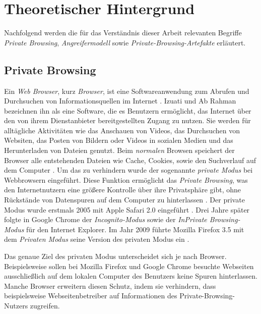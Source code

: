 \chapter{Theoretischer Hintergrund}\label{chap:theorie}

Nachfolgend werden die für das Verständnis dieser Arbeit relevanten Begriffe \textit{Private Browsing}, \textit{Angreifermodell} sowie \textit{Private-Browsing-Artefakte} erläutert.

\section{Private Browsing}\label{chap:theorie-private-browsing}

Ein \textit{Web Browser}, kurz \textit{Browser}, ist eine Softwareanwendung zum Abrufen und Durchsuchen von Informationsquellen im Internet \cite{Rochmadi.2017}. Izuati und Ab Rahman \cite{Izzati.2022} bezeichnen ihn als eine Software, die es Benutzern ermöglicht, das Internet über den von ihrem Dienstanbieter bereitgestellten Zugang zu nutzen. Sie werden für alltägliche Aktivitäten wie das Anschauen von Videos, das Durchsuchen von Websiten, das Posten von Bildern oder Videos in sozialen Medien und das Herunterladen von Dateien genutzt. \cite{Izzati.2022}
Beim \textit{normalen} Browsen speichert der Browser alle entstehenden Dateien wie Cache, Cookies, sowie den Suchverlauf auf dem Computer \cite{Izzati.2022}. Um das zu verhindern wurde der sogenannte \textit{private Modus} bei Webbrowsern eingeführt. Diese Funktion ermöglicht das \textit{Private Browsing}, was den Internetnutzern eine größere Kontrolle über ihre Privatsphäre gibt, ohne Rückstände von Datenspuren auf dem Computer zu hinterlassen \cite{Said.2011}. Der private Modus wurde erstmals 2005 mit Apple Safari 2.0 eingeführt \cite{Said.2011}. Drei Jahre später folgte in Google Chrome der \textit{Incognito-Modus} sowie der \textit{InPrivate Browsing-Modus} für den Internet Explorer. Im Jahr 2009 führte Mozilla Firefox 3.5 mit dem \textit{Privaten Modus} seine Version des privaten Modus ein \cite{Montasari.2015}.

Das genaue Ziel des privaten Modus unterscheidet sich je nach Browser. Beispielsweise sollen bei Mozilla Firefox und Google Chrome besuchte Webseiten ausschließlich auf dem lokalen Computer des Benutzers keine Spuren hinterlassen. \cite{MozillaWiki.05.06.2023,GoogleChrome.} Manche Browser erweitern diesen Schutz, indem sie verhindern, dass beispielsweise Webseitenbetreiber auf Informationen des Private-Browsing-Nutzers zugreifen. \cite{Tor.24.05.2023}

